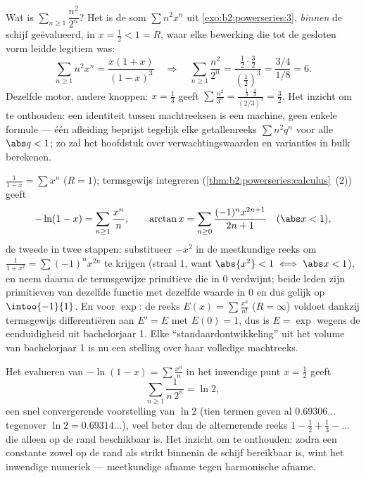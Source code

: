 \begin{example}\label{ex:b2:powerseries:evaluate}
Wat is $\sum_{n\geq1}\dfrac{n^2}{2^n}$? Het is de som $\sum n^2x^n$
uit \cref{exo:b2:powerseries:3}, \emph{binnen} de schijf
geëvalueerd, in $x = \frac12 < 1 = R$, waar elke bewerking die tot
de gesloten vorm leidde legitiem was:
\[
\sum_{n\geq1} n^2x^n = \frac{x(1+x)}{(1-x)^3}
\quad\Longrightarrow\quad
\sum_{n\geq1}\frac{n^2}{2^n}
= \frac{\frac12\cdot\frac32}{(\frac12)^3}
= \frac{3/4}{1/8} = 6 .
\]
Dezelfde motor, andere knoppen: $x = \frac13$ geeft
$\sum\frac{n^2}{3^n} = \frac{\frac13\cdot\frac43}{(2/3)^3} =
\frac32$. Het inzicht om te onthouden: een identiteit tussen
machtreeksen is een machine, geen enkele formule --- één afleiding
beprijst tegelijk elke getallenreeks $\sum n^2q^n$ voor alle $\abs
q < 1$; zo zal het hoofdstuk over 
verwachtingswaarden en varianties in bulk berekenen.
\end{example}

\begin{example}\label{ex:b2:powerseries:classics}
$\displaystyle\frac{1}{1 - x} = \sum x^n$ ($R = 1$); termsgewijs
integreren (\cref{thm:b2:powerseries:calculus}~(2)) geeft
\[
-\ln(1 - x) = \sum_{n\geq1} \frac{x^n}{n},
\qquad
\arctan x = \sum_{n \geq 0} \frac{(-1)^n x^{2n+1}}{2n+1}
\quad (\abs x < 1),
\]
de tweede in twee stappen: substitueer $-x^2$ in de meetkundige
reeks om $\frac{1}{1+x^2} = \sum(-1)^nx^{2n}$ te krijgen (straal
$1$, want $\abs{x^2} < 1 \iff \abs x < 1$), en neem daarna de
termsgewijze primitieve die in $0$ verdwijnt; beide leden zijn
primitieven van dezelfde functie met dezelfde waarde in $0$ en dus
gelijk op $\intoo{-1}{1}$. En voor $\exp$: de reeks $E(x) = \sum
\frac{x^n}{n!}$ ($R = \infty$) voldoet dankzij termsgewijs
differentiëren aan $E' = E$ met $E(0) = 1$, dus is $E = \exp$
wegens de eenduidigheid uit bachelorjaar 1. Elke
``standaardontwikkeling'' uit het volume van bachelorjaar 1 is nu
een stelling over haar volledige machtreeks.
\end{example}

\begin{example}\label{ex:b2:powerseries:lntwo}
Het evalueren van $-\ln(1-x) = \sum\frac{x^n}{n}$ in het inwendige
punt $x = \frac12$ geeft
\[
\sum_{n\geq1}\frac{1}{n\,2^n} = \ln 2 ,
\]
een snel convergerende voorstelling van $\ln 2$ (tien termen geven
al $0.69306\ldots$ tegenover $\ln 2 = 0.69314\ldots$), veel beter
dan de alternerende reeks $1 - \frac12 + \frac13 - \dots$ die
alleen op de rand beschikbaar is. Het inzicht om te onthouden:
zodra een constante zowel op de rand als strikt binnenin de schijf
bereikbaar is, wint het inwendige numeriek --- meetkundige afname
tegen harmonische afname.
\end{example}


